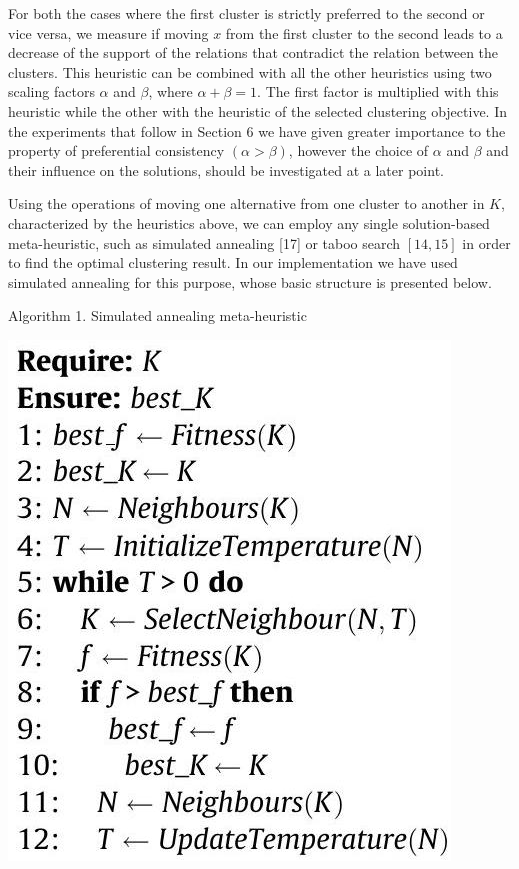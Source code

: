 \documentclass[10pt]{article}
\begin{document}
For both the cases where the first cluster is strictly preferred to the second or vice versa, we measure if moving $x$ from the first cluster to the second leads to a decrease of the support of the relations that contradict the relation between the clusters. This heuristic can be combined with all the other heuristics using two scaling factors $\alpha$ and $\beta$, where $\alpha+\beta=1$. The first factor is multiplied with this heuristic while the other with the heuristic of the selected clustering objective. In the experiments that follow in Section 6 we have given greater importance to the property of preferential consistency $(\alpha>\beta)$, however the choice of $\alpha$ and $\beta$ and their influence on the solutions, should be investigated at a later point.

Using the operations of moving one alternative from one cluster to another in $K$, characterized by the heuristics above, we can employ any single solution-based meta-heuristic, such as simulated annealing [17] or taboo search $[14,15]$ in order to find the optimal clustering result. In our implementation we have used simulated annealing for this purpose, whose basic structure is presented below.

Algorithm 1. Simulated annealing meta-heuristic

\begin{center}
\includegraphics[max width=\textwidth]{2024_01_11_fda3c6ffd32dd805faacg-6}
\end{center}
\end{document}
